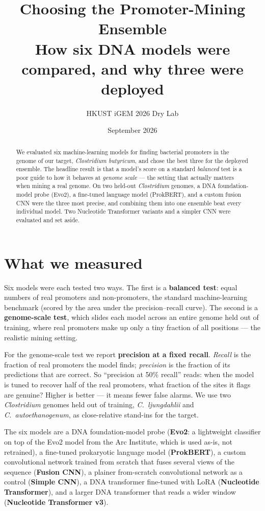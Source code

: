 \documentclass{article}
\title{Choosing the Promoter-Mining Ensemble\\ \large How six DNA models were compared, and why three were deployed}
\date{September 2026}
\author{HKUST iGEM 2026 Dry Lab}
\begin{document}
\maketitle

\begin{abstract}
We evaluated six machine-learning models for finding bacterial promoters in the genome of our target,
\emph{Clostridium butyricum}, and chose the best three for the deployed ensemble. The headline result is
that a model's score on a standard \emph{balanced} test is a poor guide to how it behaves at \emph{genome
scale} --- the setting that actually matters when mining a real genome. On two held-out \emph{Clostridium}
genomes, a DNA foundation-model probe (Evo2), a fine-tuned language model (ProkBERT), and a custom fusion
CNN were the three most precise, and combining them into one ensemble beat every individual model. Two
Nucleotide Transformer variants and a simpler CNN were evaluated and set aside.
\end{abstract}

\section{What we measured}
Six models were each tested two ways. The first is a \textbf{balanced test}: equal numbers of real
promoters and non-promoters, the standard machine-learning benchmark (scored by the area under the
precision--recall curve). The second is a \textbf{genome-scale test}, which slides each model across an
entire genome held out of training, where real promoters make up only a tiny fraction of all positions
--- the realistic mining setting.

For the genome-scale test we report \textbf{precision at a fixed recall}. \emph{Recall} is the fraction of
real promoters the model finds; \emph{precision} is the fraction of its predictions that are correct. So
``precision at 50\% recall'' reads: when the model is tuned to recover half of the real promoters, what
fraction of the sites it flags are genuine? Higher is better --- it means fewer false alarms. We use two
\emph{Clostridium} genomes held out of training, \emph{C.\ ljungdahlii} and \emph{C.\ autoethanogenum},
as close-relative stand-ins for the target.

The six models are a DNA foundation-model probe (\textbf{Evo2}: a lightweight classifier on top of the
Evo2 model from the Arc Institute, which is used as-is, not retrained), a fine-tuned prokaryotic language
model (\textbf{ProkBERT}), a custom convolutional network trained from scratch that fuses several views of
the sequence (\textbf{Fusion CNN}), a plainer from-scratch convolutional network as a control
(\textbf{Simple CNN}), a DNA transformer fine-tuned with LoRA (\textbf{Nucleotide Transformer}), and a
larger DNA transformer that reads a wider window (\textbf{Nucleotide Transformer v3}).
\end{document}
